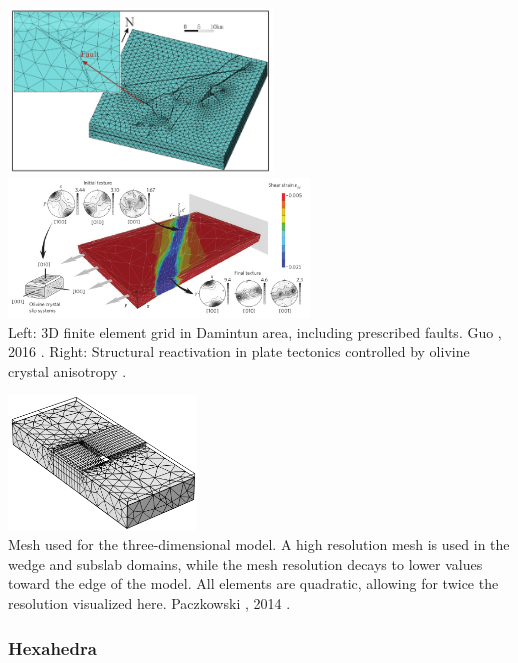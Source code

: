 \begin{center}
\includegraphics[width=7cm]{images/meshes/guyr16}
\includegraphics[width=8cm]{images/meshes/tokv09}\\
{\captionfont Left: 3D finite element grid in Damintun area, including prescribed faults. Guo \etal, 2016 \cite{guyr16}.
Right: Structural reactivation in plate tectonics controlled by olivine crystal anisotropy \cite{tokv09}.}
\end{center}



\begin{center}
\includegraphics[width=5cm]{images/meshes/paml14b}\\
{\captionfont Mesh used for the three-dimensional model. A high resolution mesh is used in
the wedge and subslab domains, while the mesh resolution decays to lower values
toward the edge of the model. All elements are quadratic, allowing for twice the
resolution visualized here. Paczkowski \etal, 2014 \cite{paml14b}.}
\end{center}

\subsubsection{Hexahedra}

